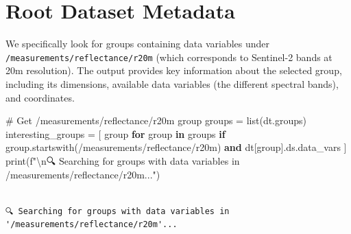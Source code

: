 \documentclass[
  letterpaper,
  DIV=11,
  numbers=noendperiod]{scrreprt}
\newenvironment{Shaded}{\begin{snugshade}}{\end{snugshade}}
\newcommand{\BuiltInTok}[1]{\textcolor[rgb]{0.00,0.23,0.31}{#1}}
\newcommand{\CharTok}[1]{\textcolor[rgb]{0.13,0.47,0.30}{#1}}
\newcommand{\CommentTok}[1]{\textcolor[rgb]{0.37,0.37,0.37}{#1}}
\newcommand{\ControlFlowTok}[1]{\textcolor[rgb]{0.00,0.23,0.31}{\textbf{#1}}}
\newcommand{\KeywordTok}[1]{\textcolor[rgb]{0.00,0.23,0.31}{\textbf{#1}}}
\newcommand{\NormalTok}[1]{\textcolor[rgb]{0.00,0.23,0.31}{#1}}
\newcommand{\OperatorTok}[1]{\textcolor[rgb]{0.37,0.37,0.37}{#1}}
\newcommand{\SpecialStringTok}[1]{\textcolor[rgb]{0.13,0.47,0.30}{#1}}
\newcommand{\StringTok}[1]{\textcolor[rgb]{0.13,0.47,0.30}{#1}}
\begin{document}
\section{Root Dataset Metadata}\label{root-dataset-metadata}

We specifically look for groups containing data variables under
\texttt{/measurements/reflectance/r20m} (which corresponds to Sentinel-2
bands at 20m resolution). The output provides key information about the
selected group, including its dimensions, available data variables (the
different spectral bands), and coordinates.

\begin{Shaded}
\begin{Highlighting}[]
\CommentTok{\# Get /measurements/reflectance/r20m group}
\NormalTok{groups }\OperatorTok{=} \BuiltInTok{list}\NormalTok{(dt.groups)}
\NormalTok{interesting\_groups }\OperatorTok{=}\NormalTok{ [}
\NormalTok{    group }\ControlFlowTok{for}\NormalTok{ group }\KeywordTok{in}\NormalTok{ groups }\ControlFlowTok{if}\NormalTok{ group.startswith(}\StringTok{\textquotesingle{}/measurements/reflectance/r20m\textquotesingle{}}\NormalTok{)}
    \KeywordTok{and}\NormalTok{ dt[group].ds.data\_vars}
\NormalTok{]}
\BuiltInTok{print}\NormalTok{(}\SpecialStringTok{f"}\CharTok{\textbackslash{}n}\SpecialStringTok{🔍 Searching for groups with data variables in \textquotesingle{}/measurements/reflectance/r20m\textquotesingle{}..."}\NormalTok{)}
\end{Highlighting}
\end{Shaded}

\begin{verbatim}

🔍 Searching for groups with data variables in '/measurements/reflectance/r20m'...
\end{verbatim}
\end{document}
